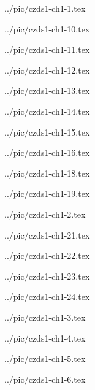 

../pic/czds1-ch1-1.tex



../pic/czds1-ch1-10.tex



../pic/czds1-ch1-11.tex



../pic/czds1-ch1-12.tex



../pic/czds1-ch1-13.tex



../pic/czds1-ch1-14.tex



../pic/czds1-ch1-15.tex



../pic/czds1-ch1-16.tex



../pic/czds1-ch1-18.tex



../pic/czds1-ch1-19.tex



../pic/czds1-ch1-2.tex



../pic/czds1-ch1-21.tex



../pic/czds1-ch1-22.tex



../pic/czds1-ch1-23.tex



../pic/czds1-ch1-24.tex



../pic/czds1-ch1-3.tex



../pic/czds1-ch1-4.tex



../pic/czds1-ch1-5.tex



../pic/czds1-ch1-6.tex

